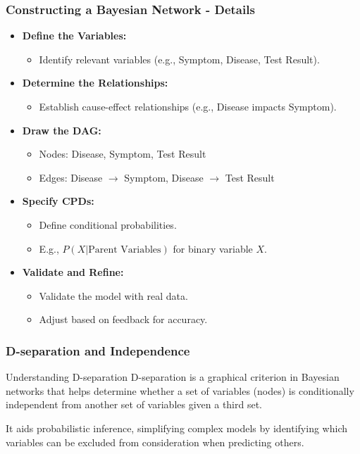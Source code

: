 \documentclass[aspectratio=169]{beamer}
\begin{document}
\begin{frame}[fragile]
    \frametitle{Constructing a Bayesian Network - Details}
    \begin{itemize}
        \item \textbf{Define the Variables:}
            \begin{itemize}
                \item Identify relevant variables (e.g., Symptom, Disease, Test Result).
            \end{itemize}
        
        \item \textbf{Determine the Relationships:}
            \begin{itemize}
                \item Establish cause-effect relationships (e.g., Disease impacts Symptom).
            \end{itemize}
        
        \item \textbf{Draw the DAG:}
            \begin{itemize}
                \item Nodes: Disease, Symptom, Test Result
                \item Edges: Disease $\rightarrow$ Symptom, Disease $\rightarrow$ Test Result
            \end{itemize}
        
        \item \textbf{Specify CPDs:}
            \begin{itemize}
                \item Define conditional probabilities.
                \item E.g., $P(X | \text{Parent Variables})$ for binary variable \(X\).
            \end{itemize}
        
        \item \textbf{Validate and Refine:}
            \begin{itemize}
                \item Validate the model with real data.
                \item Adjust based on feedback for accuracy.
            \end{itemize}
    \end{itemize}
\end{frame}

\begin{frame}[fragile]
    \frametitle{D-separation and Independence}
    \begin{block}{Understanding D-separation}
        D-separation is a graphical criterion in Bayesian networks that helps determine whether a set of variables (nodes) is conditionally independent from another set of variables given a third set.
    \end{block}
    It aids probabilistic inference, simplifying complex models by identifying which variables can be excluded from consideration when predicting others.
\end{frame}
\end{document}
